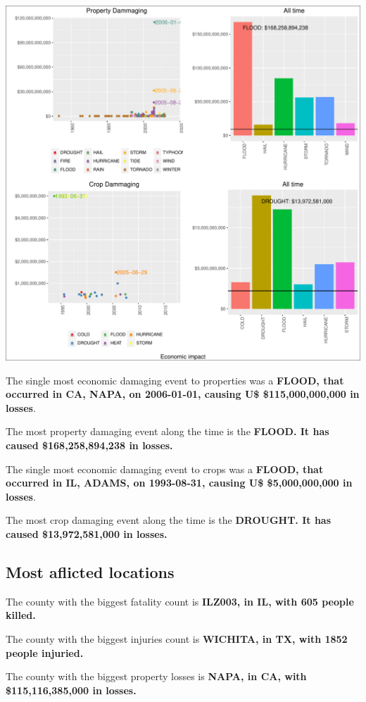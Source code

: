 \documentclass[]{article}
\begin{document}
\includegraphics{readme_files/figure-latex/economic-plot-1.pdf}

The single most economic damaging event to properties was a
\textbf{FLOOD, that occurred in CA, NAPA, on 2006-01-01, causing U\$
\$115,000,000,000 in losses}.

The most property damaging event along the time is the \textbf{FLOOD. It
has caused \$168,258,894,238 in losses.}

The single most economic damaging event to crops was a \textbf{FLOOD,
that occurred in IL, ADAMS, on 1993-08-31, causing U\$ \$5,000,000,000
in losses}.

The most crop damaging event along the time is the \textbf{DROUGHT. It
has caused \$13,972,581,000 in losses.}

\subsection{Most aflicted locations}\label{most-aflicted-locations-1}

The county with the biggest fatality count is \textbf{ILZ003, in IL,
with 605 people killed.}

The county with the biggest injuries count is \textbf{WICHITA, in TX,
with 1852 people injuried.}

The county with the biggest property losses is \textbf{NAPA, in CA, with
\$115,116,385,000 in losses.}
\end{document}
